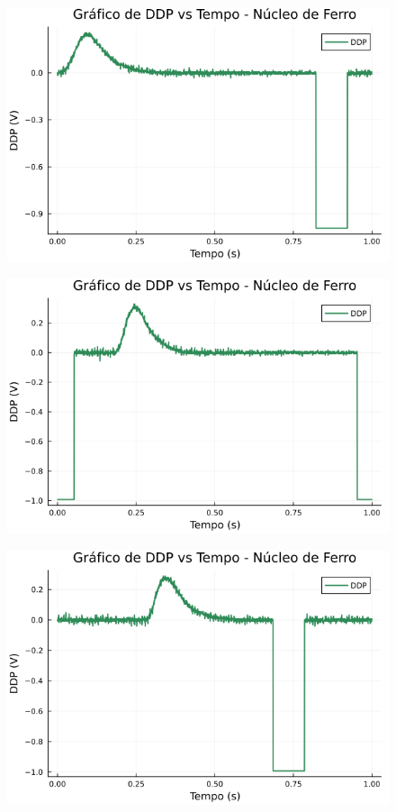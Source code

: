 \begin{center}
\begin{multicols}{2}
\begin{figure}[H]
    \centering
    \includegraphics[width=1.0\linewidth]{figuras/grafico_dados3_F0009CH1.png}
\end{figure}

\begin{figure}[H]
    \centering
    \includegraphics[width=1.0\linewidth]{figuras/grafico_dados3_F0010CH1.png}
\end{figure}

\begin{figure}[H]
    \centering
    \includegraphics[width=1.0\linewidth]{figuras/grafico_dados3_F0011CH1.png}
\end{figure}


\end{multicols}
\end{center}
